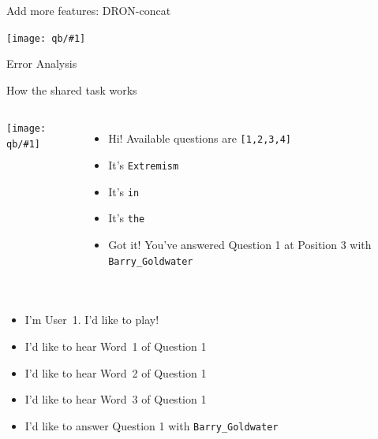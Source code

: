 \documentclass[aspectratio=169,xcolor=dvipsnames]{beamer}
\newcommand{\gfxq}[2]{
\begin{center}
	\texttt{[image: qb/\#1]}
\end{center}
}
\begin{document}
\begin{frame}{Add more features: DRON-concat}

  \gfxq{dron-concat}{.8}

\end{frame}


\begin{frame}{Error Analysis}

  \only<1>{\gfxq{error1}{.8}}
  \only<2>{\gfxq{error2}{.8}}
  \only<3>{\gfxq{error3}{.8}}
  \only<4>{\gfxq{error4}{.8}}
  \only<5>{\gfxq{error5}{.8}}
  \only<6>{\gfxq{error6}{.8}}
  \only<7>{\gfxq{error7}{.8}}

\end{frame}



\begin{frame}{How the shared task works}

\begin{columns}
  \gfxq{bamber}{.5}

  \begin{itemize}
    \item<3-> Hi! Available questions are \texttt{[1,2,3,4]}
    \item<5-> It's \texttt{Extremism}
    \item<7-> It's \texttt{in}
    \item<9-> It's \texttt{the}
    \item<11-> Got it!  You've answered Question 1 at Position
      3 with \texttt{Barry\_Goldwater}
  \end{itemize}

\end{columns}


\begin{columns}

  \begin{itemize}
    \item<2-> I'm User~1.  I’d like to play!
    \item<4-> I’d like to hear Word~1 of Question 1
    \item<6-> I’d like to hear Word~2 of Question 1
    \item<8-> I’d like to hear Word~3 of Question 1
    \item<10-> I’d like to answer Question 1 with
      \texttt{Barry\_Goldwater}
    \end{itemize}
  \only<2->{\gfxq{buzzer}{.5}}
\end{columns}

\end{frame}
\end{document}
